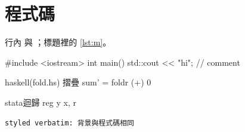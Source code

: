\documentclass[lang=zh, code=minted, verbatim=styled]{akizumi-book}
\begin{document}
\chapter{程式碼}
\listofcodes

行內  與 ；標題裡的
\cref{lst:m}。

\begin{codeblock}[numbered, label=lst:m, title=main.cpp, lang=cpp]
#include <iostream>
int main() { std::cout << "hi\n"; }  // comment
\end{codeblock}

\begin{example}{haskell}{(fold.hs) 摺疊}
sum' = foldr (+) 0
\end{example}

\begin{code}{stata}{迴歸}
reg y x, r
\end{code}



\begin{verbatim}
styled verbatim: 背景與程式碼相同
\end{verbatim}
\end{document}
